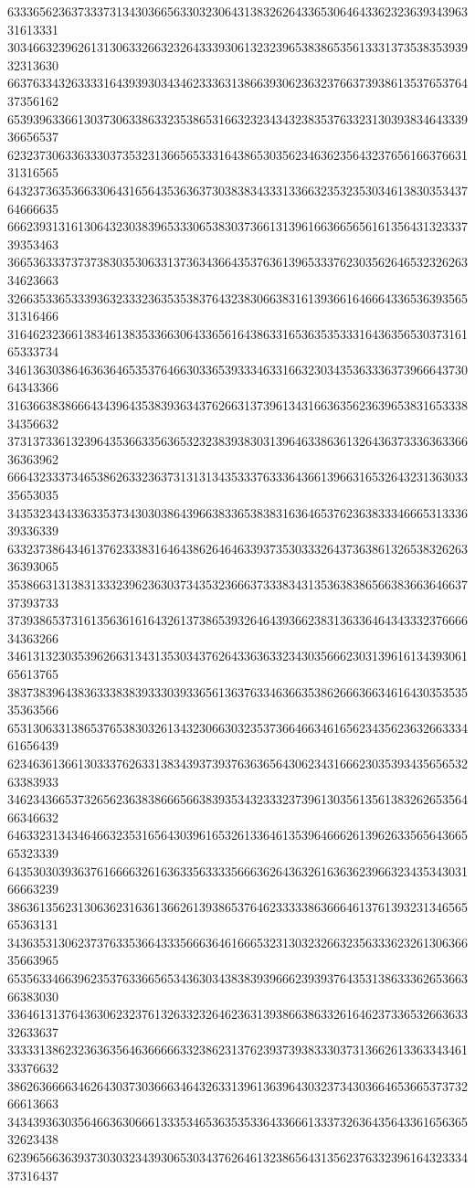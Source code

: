 63336562363733373134303665633032306431383262643365306464336232363934396331613331
30346632396261313063326632326433393061323239653838653561333137353835393932313630
66376334326333316439393034346233363138663930623632376637393861353765376437356162
65393963366130373063386332353865316632323434323835376332313039383464333936656537
62323730633633303735323136656533316438653035623463623564323765616637663131316565
64323736353663306431656435363637303838343331336632353235303461383035343764666635
66623931316130643230383965333065383037366131396166366565616135643132333739353463
36653633373737383035306331373634366435376361396533376230356264653232626334623663
32663533653339363233323635353837643238306638316139366164666433653639356531316466
31646232366138346138353366306433656164386331653635353331643635653037316165333734
34613630386463636465353764663033653933346331663230343536333637396664373064343366
31636638386664343964353839363437626631373961343166363562363965383165333834356632
37313733613239643536633563653232383938303139646338636132643637333636336636363962
66643233373465386263323637313131343533376333643661396631653264323136303335653035
34353234343363353734303038643966383365383831636465376236383334666531333639336339
63323738643461376233383164643862646463393735303332643736386132653832626336393065
35386631313831333239623630373435323666373338343135363838656638366364663737393733
37393865373161356361616432613738653932646439366238313633646434333237666634363266
34613132303539626631343135303437626433636332343035666230313961613439306165613765
38373839643836333838393330393365613637633463663538626663663461643035353535363566
65313063313865376538303261343230663032353736646634616562343562363266333461656439
62346361366130333762633138343937393763636564306234316662303539343565653263383933
34623436653732656236383866656638393534323332373961303561356138326265356466346632
64633231343464663235316564303961653261336461353964666261396263356564366565323339
64353030393637616666326163633563333566636264363261636362396632343534303166663239
38636135623130636231636136626139386537646233333863666461376139323134656565363131
34363531306237376335366433356663646166653231303232663235633362326130636635663965
65356334663962353763366565343630343838393966623939376435313863336265366366383030
33646131376436306232376132633232646236313938663863326164623733653266363332633637
33333138623236363564636666633238623137623937393833303731366261336334346133376632
38626366663462643037303666346432633139613639643032373430366465366537373266613663
34343936303564663630666133353465363535336433666133373263643564336165636532623438
62396566363937303032343930653034376264613238656431356237633239616432333437316437

